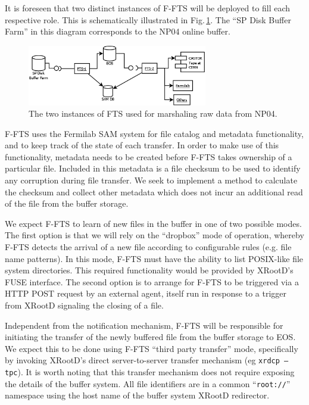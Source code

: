 \documentclass[pdftex,12pt,letter]{article}
\newcommand{\xrd}{XRootD\xspace}
\begin{document}
\noindent It is foreseen that two distinct instances of F-FTS will be deployed to fill each
respective role. This is schematically illustrated in Fig.\,\ref{fig:ftsinstances}. The ``SP Disk
Buffer Farm'' in this diagram corresponds to the NP04 online buffer.

\begin{figure}[tbh]
  \centering
  \includegraphics[width=0.7\textwidth]{figures/ftsinstances_v2.png}
  \caption{The two instances of FTS used for marshaling raw data from NP04.}
  \label{fig:ftsinstances}
\end{figure}

F-FTS uses the Fermilab SAM system for file catalog and metadata functionality,
and to keep track of the state of each transfer. In order to make use of this functionality, metadata
needs to be created before F-FTS takes ownership of a particular file. 
Included in this metadata is a file checksum to be used to identify any corruption during file transfer.
We seek to implement a method to calculate the checksum and collect other metadata which does 
not incur an additional read of the file from the buffer storage.

We expect F-FTS to learn of new files in the buffer in one of two
possible modes.  
%
The first option is that we will rely on the ``dropbox'' mode of
operation, whereby F-FTS detects the arrival of a new file according
to configurable rules (e.g. file name patterns). In this mode, F-FTS
must have the ability to list POSIX-like file system directories.
This required functionality would be provided by \xrd's FUSE
interface.
%
The second option is to arrange for F-FTS to be triggered via a HTTP
POST request by an external agent, itself run in response to a trigger
from \xrd signaling the closing of a file.

Independent from the notification mechanism, F-FTS will be responsible
for initiating the transfer of the newly buffered file from the buffer
storage to EOS.  We expect this to be done using F-FTS ``third party
transfer'' mode, specifically by invoking \xrd's direct
server-to-server transfer mechanism (eg \texttt{xrdcp --tpc}).  It is
worth noting that this transfer mechanism does not require exposing
the details of the buffer system.  All file identifiers are in a
common ``\texttt{root://}'' namespace using the host name of the
buffer system \xrd redirector.
\end{document}
